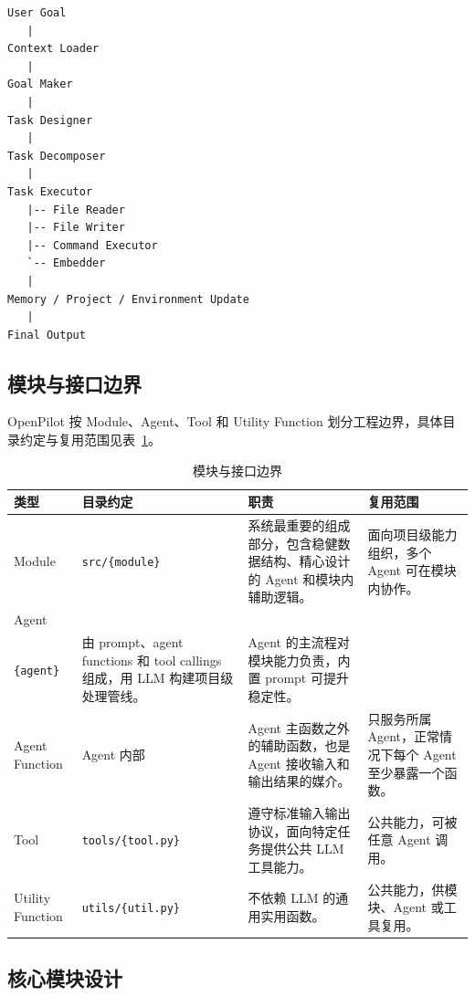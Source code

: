 \documentclass[12pt,a4paper]{ctexart}
\begin{document}
\begin{verbatim}
User Goal
   |
Context Loader
   |
Goal Maker
   |
Task Designer
   |
Task Decomposer
   |
Task Executor
   |-- File Reader
   |-- File Writer
   |-- Command Executor
   `-- Embedder
   |
Memory / Project / Environment Update
   |
Final Output
\end{verbatim}

\subsection{模块与接口边界}

OpenPilot 按 Module、Agent、Tool 和 Utility Function 划分工程边界，具体目录约定与复用范围见表~\ref{tab:module-interface-boundary}。

\begin{table}[htbp]
  \centering
  \small
  \begin{tabularx}{\textwidth}{p{2.7cm} p{3.2cm} X X}
    \toprule
    \textbf{类型} & \textbf{目录约定} & \textbf{职责} & \textbf{复用范围} \\
    \midrule
    Module & \texttt{src/\{module\}} & 系统最重要的组成部分，包含稳健数据结构、精心设计的 Agent 和模块内辅助逻辑。 & 面向项目级能力组织，多个 Agent 可在模块内协作。 \\
    Agent & \shortstack[l]{\texttt{src/\{module\}/}\\\texttt{\{agent\}}} & 由 prompt、agent functions 和 tool callings 组成，用 LLM 构建项目级处理管线。 & Agent 的主流程对模块能力负责，内置 prompt 可提升稳定性。 \\
    Agent Function & Agent 内部 & Agent 主函数之外的辅助函数，也是 Agent 接收输入和输出结果的媒介。 & 只服务所属 Agent，正常情况下每个 Agent 至少暴露一个函数。 \\
    Tool & \texttt{tools/\{tool.py\}} & 遵守标准输入输出协议，面向特定任务提供公共 LLM 工具能力。 & 公共能力，可被任意 Agent 调用。 \\
    Utility Function & \texttt{utils/\{util.py\}} & 不依赖 LLM 的通用实用函数。 & 公共能力，供模块、Agent 或工具复用。 \\
    \bottomrule
  \end{tabularx}
  \caption{模块与接口边界}
  \label{tab:module-interface-boundary}
\end{table}

\subsection{核心模块设计}
\end{document}
